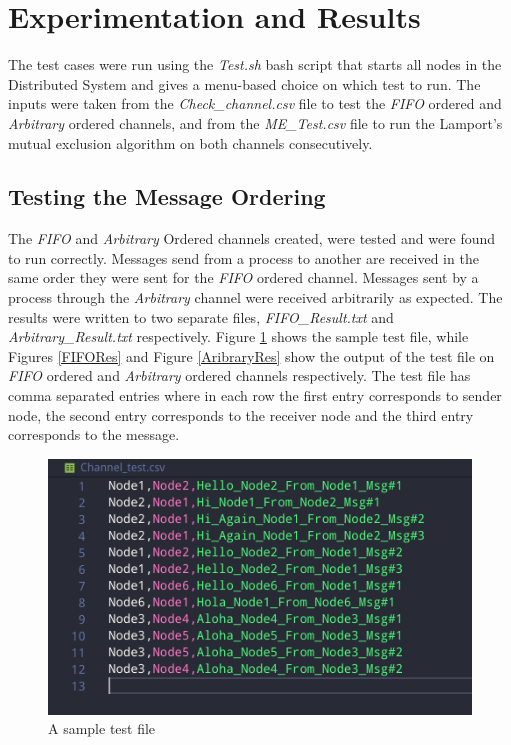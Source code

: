 \documentclass[a4paper, 12pt]{article}
\begin{document}
	\section{Experimentation and Results}
		The test cases were run using the \textit{Test.sh} bash script that starts all nodes in the Distributed System and gives a menu-based choice on which test to run. The inputs were taken from the \textit{Check\_channel.csv} file to test the \textit{FIFO} ordered and \textit{Arbitrary} ordered channels, and from the \textit{ME\_Test.csv} file to run the Lamport's mutual exclusion algorithm on both channels consecutively.
		\subsection{Testing the Message Ordering}
			The \textit{FIFO} and \textit{Arbitrary} Ordered channels created, were tested and were found to run correctly. Messages send from a process to another are received in the same order they were sent for the \textit{FIFO} ordered channel. Messages sent by a process through the \textit{Arbitrary} channel were received arbitrarily as expected. The results were written to two separate files, \textit{FIFO\_Result.txt} and \textit{Arbitrary\_Result.txt} respectively. Figure \ref{ChannelTest} shows the sample test file, while Figures \ref{FIFORes} and Figure \ref{AribraryRes} show the output of the test file on \textit{FIFO} ordered and \textit{Arbitrary} ordered channels respectively. The test file has comma separated entries where in each row the first entry corresponds to sender node, the second entry corresponds to the receiver node and the third entry corresponds to the message.
			
			\begin{figure}[H]
				\includegraphics[width=\linewidth]{Channel_Test.png}
				\caption{A sample test file}
				\label{ChannelTest}
			\end{figure}
		
\end{document}
